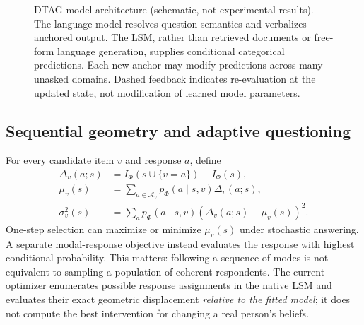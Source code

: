 \documentclass[journal,10pt]{IEEEtran}
\newcommand{\Ph}{\Phi}
\begin{document}
\begin{figure}[!t]
\centering
{}
\caption{DTAG model architecture (schematic, not experimental results). The language model resolves question semantics and verbalizes anchored output. The LSM, rather than retrieved documents or free-form language generation, supplies conditional categorical predictions. Each new anchor may modify predictions across many unasked domains. Dashed feedback indicates re-evaluation at the updated state, not modification of learned model parameters.}
\label{fig:arch}
\end{figure}

\subsection{Sequential geometry and adaptive questioning}
For every candidate item $v$ and response $a$, define
\begin{align}
\Delta_v(a;s)&=I_\Ph(s\cup\{v=a\})-I_\Ph(s),\label{eq:delta}\\
\mu_v(s)&=\sum_{a\in\mathcal A_v}p_\Ph(a\mid s,v)\Delta_v(a;s),\label{eq:mu}\\
\sigma_v^2(s)&=\sum_a p_\Ph(a\mid s,v)(\Delta_v(a;s)-\mu_v(s))^2.
\label{eq:var}
\end{align}
One-step selection can maximize or minimize $\mu_v(s)$ under stochastic answering. A separate modal-response objective instead evaluates the response with highest conditional probability. This matters: following a sequence of modes is not equivalent to sampling a population of coherent respondents. The current optimizer enumerates possible response assignments in the native LSM and evaluates their exact geometric displacement \emph{relative to the fitted model}; it does not compute the best intervention for changing a real person's beliefs.
\end{document}
